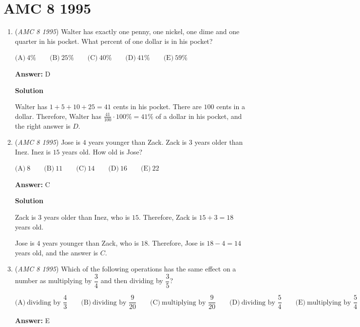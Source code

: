 \section{AMC 8 1995}
        \begin{enumerate}
        	\item (\textit{AMC 8 1995}) Walter has exactly one penny, one nickel, one dime and one quarter in his pocket.  What percent of one dollar is in his pocket?


 $\text{(A)}\ 4\% \qquad \text{(B)}\ 25\% \qquad \text{(C)}\ 40\% \qquad \text{(D)}\ 41\% \qquad \text{(E)}\ 59\%$

 \textbf{Answer: }D



\textbf{Solution}

Walter has $1 + 5 + 10 + 25 = 41$ cents in his pocket.  There are $100$ cents in a dollar.  Therefore, Walter has $\frac{41}{100}\cdot 100\% = 41\%$ of a dollar in his pocket, and the right answer is $\boxed{D}$.

 


	\item (\textit{AMC 8 1995}) Jose is $4$ years younger than Zack.  Zack is $3$ years older than Inez.  Inez is $15$ years old.  How old is Jose?


 $\text{(A)}\ 8 \qquad \text{(B)}\ 11 \qquad \text{(C)}\ 14 \qquad \text{(D)}\ 16 \qquad \text{(E)}\ 22$

 \textbf{Answer: }C



\textbf{Solution}

Zack is $3$ years older than Inez, who is $15$.  Therefore, Zack is $15 + 3 = 18$ years old.

 Jose is $4$ years younger than Zack, who is $18$.  Therefore, Jose is $18 - 4 = 14$ years old, and the answer is $\boxed{C}$.

 


	\item (\textit{AMC 8 1995}) Which of the following operations has the same effect on a number as multiplying by $\dfrac{3}{4}$ and then dividing by $\dfrac{3}{5}$?


 $\text{(A)}\ \text{dividing by }\dfrac{4}{3} \qquad \text{(B)}\ \text{dividing by }\dfrac{9}{20} \qquad \text{(C)}\ \text{multiplying by }\dfrac{9}{20} \qquad \text{(D)}\ \text{dividing by }\dfrac{5}{4} \qquad \text{(E)}\ \text{multiplying by }\dfrac{5}{4}$

 \textbf{Answer: }E




\end{enumerate}
